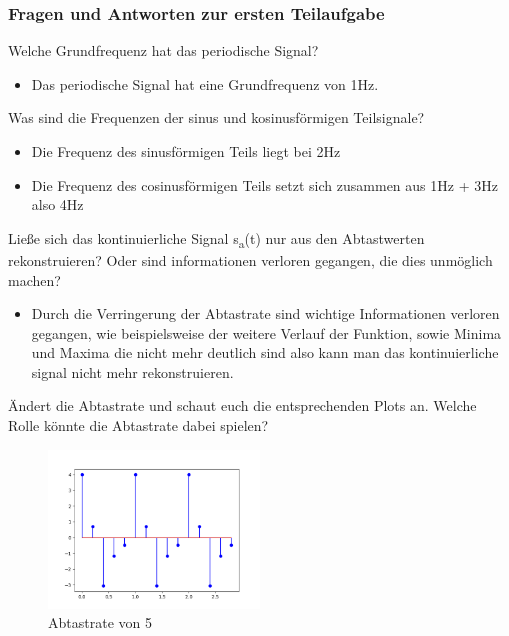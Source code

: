 \documentclass[a4paper, 11pt]{article}
\begin{document}
    \subsubsection{Fragen und Antworten zur ersten Teilaufgabe}
    Welche Grundfrequenz hat das periodische Signal? 
    \begin{itemize}
    \item Das periodische Signal hat eine Grundfrequenz von 1Hz.  
    \end{itemize}
    Was sind die Frequenzen der sinus und kosinusförmigen Teilsignale?
    \begin{itemize}
        \item Die Frequenz des sinusförmigen Teils liegt bei 2Hz
        \item Die Frequenz des cosinusförmigen Teils setzt sich zusammen aus 1Hz + 3Hz also 4Hz 
    \end{itemize}
    Ließe sich das kontinuierliche Signal s\textsubscript{a}(t) nur aus den Abtastwerten rekonstruieren? Oder sind informationen verloren gegangen, die dies unmöglich machen?
    \begin{itemize}
        \item Durch die Verringerung der Abtastrate sind wichtige Informationen verloren gegangen, wie beispielsweise der weitere Verlauf der Funktion, sowie Minima und Maxima die nicht mehr deutlich sind 
        also kann man das kontinuierliche signal nicht mehr rekonstruieren.
    \end{itemize}
    Ändert die Abtastrate und schaut euch die entsprechenden Plots an. Welche Rolle könnte die Abtastrate dabei spielen?
    \begin{figure}
        \includegraphics[width =0.5\textwidth]{Abild220.png}
        \caption{Abtastrate von 5}
        \label{fig : label2}
        \end{figure}
    
\end{document}
